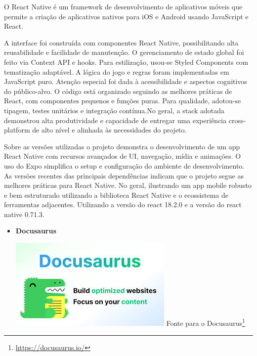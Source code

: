 \begin{itemize}
\begin{itemize}
O React Native é um framework de desenvolvimento de aplicativos móveis que permite a criação de aplicativos nativos para iOS e Android usando JavaScript e React.

A interface foi construída com componentes React Native, possibilitando alta reusabilidade e facilidade de manutenção. O gerenciamento de estado global foi feito via Context API e hooks. Para estilização, usou-se Styled Components com tematização adaptável. A lógica do jogo e regras foram implementadas em JavaScript puro. Atenção especial foi dada à acessibilidade e aspectos cognitivos do público-alvo. O código está organizado seguindo as melhores práticas de React, com componentes pequenos e funções puras. Para qualidade, adotou-se tipagem, testes unitários e integração contínua.No geral, a stack adotada demonstrou alta produtividade e capacidade de entregar uma experiência cross-platform de alto nível e alinhada às necessidades do projeto.

Sobre as versões utilizadas o projeto demonstra o desenvolvimento de um app React Native com recursos avançados de UI, navegação, mídia e animações. O uso do Expo simplifica o setup e configuração do ambiente de desenvolvimento. As versões recentes das principais dependências indicam que o projeto segue as melhores práticas para React Native. No geral, ilustrando um app mobile robusto e bem estruturado utilizando a biblioteca React Native e o ecossistema de ferramentas adjacentes. Utilizando a versão do react 18.2.0 e a versão do react native 0.71.3. 

\begin{itemize}

    \item \textbf{Docusaurus} 
    \begin{center}
    \includegraphics[width=0.5\linewidth]{figuras/Tecnologies/Docusaurus.jpg}
    \label{fig:Docusaurus}
    Fonte para o Docusaurus\footnote{\url{https://docusaurus.io/}}
\end{center}


\end{itemize}
\end{itemize}
\end{itemize}
